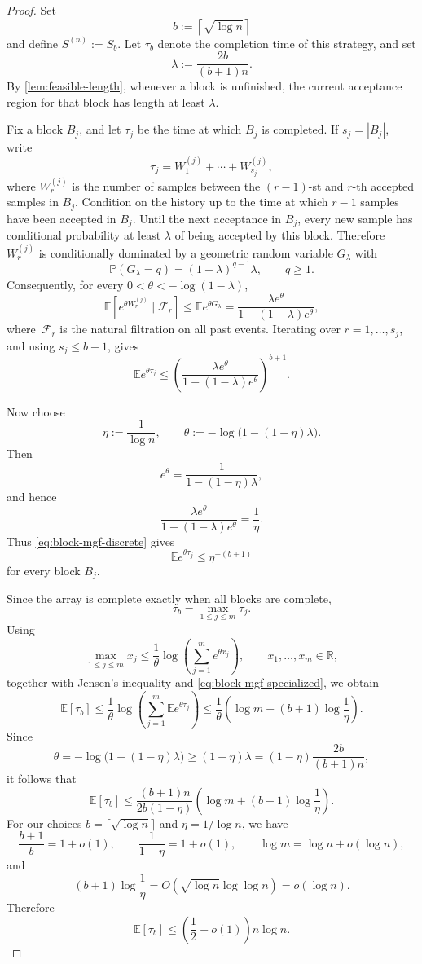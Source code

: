 \documentclass[11pt,reqno,letterpaper]{amsart}
\theoremstyle{definition}
\numberwithin{equation}{section}
\newcommand{\E}{\mathbb{E}}
\renewcommand{\P}{\mathbb{P}}
\newcommand{\R}{\mathbb{R}}
\newcommand{\mc}{\mathcal}
\begin{document}
\begin{proof}
Set
\[
b:=\left\lceil \sqrt{\log n}\right\rceil
\]
and define \(S^{(n)}:=S_b\). Let \(\tau_b\) denote the completion time of this strategy, and set
\[
\lambda:=\frac{2b}{(b+1)n}.
\]
By \cref{lem:feasible-length}, whenever a block is unfinished, the current acceptance region for that block has length at least \(\lambda\).

Fix a block \(B_j\), and let \(\tau_j\) be the time at which \(B_j\) is completed. If \(s_j=|B_j|\), write
\[
\tau_j=W_1^{(j)}+\cdots+W_{s_j}^{(j)},
\]
where \(W_r^{(j)}\) is the number of samples between the \((r-1)\)-st and \(r\)-th accepted samples in \(B_j\). Condition on the history up to the time at which \(r-1\) samples have been accepted in \(B_j\). Until the next acceptance in \(B_j\), every new sample has conditional probability at least \(\lambda\) of being accepted by this block. Therefore \(W_r^{(j)}\) is conditionally dominated by a geometric random variable \(G_\lambda\) with
\[
\P(G_\lambda=q)=(1-\lambda)^{q-1}\lambda,
\qquad q\ge1.
\]
Consequently, for every \(0<\theta<-\log(1-\lambda)\),
\[
\E\left[e^{\theta W_r^{(j)}}\mid \mc F_r \right]
\le
\E e^{\theta G_\lambda}
=
\frac{\lambda e^\theta}{1-(1-\lambda)e^\theta},
\]
where~$\mc F_r$ is the natural filtration on all past events.
Iterating over \(r=1,\dots,s_j\), and using \(s_j\le b+1\), gives
\begin{equation}\label{eq:block-mgf-discrete}
\E e^{\theta\tau_j}
\le
\left(\frac{\lambda e^\theta}{1-(1-\lambda)e^\theta}\right)^{b+1}.
\end{equation}

Now choose
\[
\eta:=\frac1{\log n},
\qquad
\theta:=-\log\bigl(1-(1-\eta)\lambda\bigr).
\]
Then
\[
e^\theta=\frac{1}{1-(1-\eta)\lambda},
\]
and hence
\[
\frac{\lambda e^\theta}{1-(1-\lambda)e^\theta}=\frac1\eta.
\]
Thus \eqref{eq:block-mgf-discrete} gives
\begin{equation}\label{eq:block-mgf-specialized}
\E e^{\theta\tau_j}\le \eta^{-(b+1)}
\end{equation}
for every block \(B_j\).

Since the array is complete exactly when all blocks are complete,
\[
\tau_b=\max_{1\le j\le m}\tau_j.
\]
Using
\[
\max_{1\le j\le m} x_j
\le
\frac1\theta\log\left(\sum_{j=1}^m e^{\theta x_j}\right),
\qquad x_1,\dots,x_m\in\R,
\]
together with Jensen's inequality and \eqref{eq:block-mgf-specialized}, we obtain
\[
\E[\tau_b]
\le
\frac1\theta
\log\left(\sum_{j=1}^m \E e^{\theta\tau_j}\right)
\le
\frac1\theta
\left(
\log m+(b+1)\log\frac1\eta
\right).
\]
Since
\[
\theta
=
-\log\bigl(1-(1-\eta)\lambda\bigr)
\ge
(1-\eta)\lambda
=
(1-\eta)\frac{2b}{(b+1)n},
\]
it follows that
\[
\E[\tau_b]
\le
\frac{(b+1)n}{2b(1-\eta)}
\left(
\log m+(b+1)\log\frac1\eta
\right).
\]
For our choices \(b=\lceil\sqrt{\log n}\rceil\) and \(\eta=1/\log n\), we have
\[
\frac{b+1}{b}=1+o(1),
\qquad
\frac1{1-\eta}=1+o(1),
\qquad
\log m=\log n+o(\log n),
\]
and
\[
(b+1)\log\frac1\eta
=
O(\sqrt{\log n}\log\log n)
=
o(\log n).
\]
Therefore
\[
\E[\tau_b]
\le
\left(\frac12+o(1)\right)n\log n.
\]


\end{proof}
\end{document}
